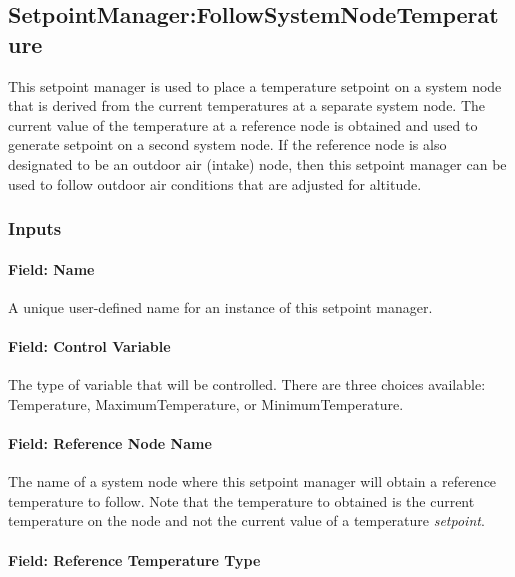 \subsection{SetpointManager:FollowSystemNodeTemperature}\label{setpointmanagerfollowsystemnodetemperature}

This setpoint manager is used to place a temperature setpoint on a system node that is derived from the current temperatures at a separate system node. The current value of the temperature at a reference node is obtained and used to generate setpoint on a second system node. If the reference node is also designated to be an outdoor air (intake) node, then this setpoint manager can be used to follow outdoor air conditions that are adjusted for altitude.

\subsubsection{Inputs}\label{inputs-21-005}

\paragraph{Field: Name}\label{field-name-21-002}

A unique user-defined name for an instance of this setpoint manager.

\paragraph{Field: Control Variable}\label{field-control-variable-15}

The type of variable that will be controlled. There are three choices available: Temperature, MaximumTemperature, or MinimumTemperature.

\paragraph{Field: Reference Node Name}\label{field-reference-node-name-1}

The name of a system node where this setpoint manager will obtain a reference temperature to follow. Note that the temperature to obtained is the current temperature on the node and not the current value of a temperature \emph{setpoint}.

\paragraph{Field: Reference Temperature Type}\label{field-reference-temperature-type-1}

